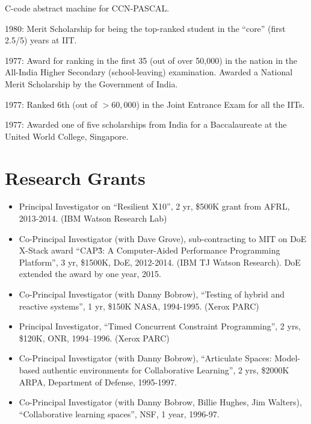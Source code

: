 \documentclass{article}
\begin{document}
\begin{description}
      C-code abstract machine for CCN-PASCAL. 
\item{1980:} Merit Scholarship for being the top-ranked student in the
      ``core'' (first 2.5/5) years  at IIT. 
\item{1977:}  Award for ranking in the first 35 (out of over 50,000) in 
      the nation in the All-India Higher Secondary (school-leaving)
      examination. Awarded a National Merit Scholarship by the
      Government of India. 
\item{1977:} Ranked 6th (out of $> 60,000$) in the Joint Entrance Exam
      for all the IITs.  
\item{1977:} Awarded one of five scholarships from India for
      a Baccalaureate at the United World College, Singapore.  
\end{description}

\section*{Research Grants}
\begin{itemize}
\item Principal Investigator on ``Resilient X10'', 2 yr, \$500K grant
  from AFRL, 2013-2014. (IBM Watson Research Lab)
\item   Co-Principal Investigator (with Dave Grove), sub-contracting
  to MIT on DoE X-Stack award ``CAP\^3:  A Computer-Aided Performance
  Programming Platform'', 3 yr, \$1500K, DoE, 2012-2014. (IBM TJ Watson
  Research). DoE extended the award by one year, 2015. 

\item   Co-Principal Investigator (with Danny Bobrow), ``Testing of hybrid
   and reactive systems'', 1 yr, \$150K NASA, 1994-1995. (Xerox PARC)

\item   Principal Investigator, ``Timed Concurrent Constraint
   Programming'', 2 yrs, \$120K, ONR, 1994--1996.  (Xerox PARC)

\item   Co-Principal Investigator (with Danny Bobrow), ``Articulate Spaces:
   Model-based authentic environments for Collaborative Learning'', 2
   yrs, \$2000K ARPA, Department of Defense, 1995-1997.

\item   Co-Principal Investigator (with Danny Bobrow, Billie Hughes, Jim
   Walters), ``Collaborative learning spaces'', NSF, 1 year, 1996-97.
\end{itemize}
\end{document}
